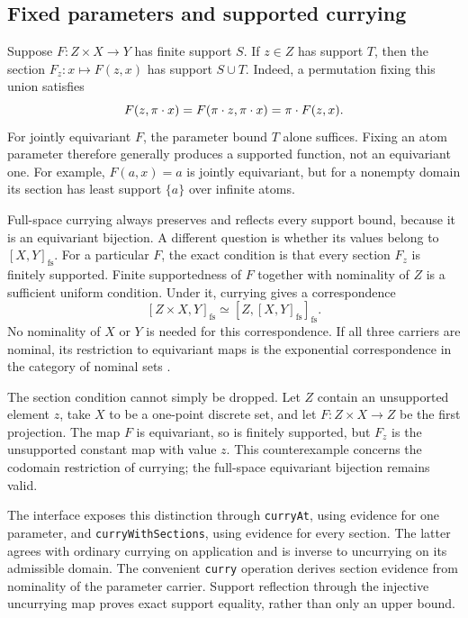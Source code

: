 \subsection{Fixed parameters and supported currying}
\label{sec:supported-currying}

Suppose $F:Z\times X\to Y$ has finite support $S$. If $z\in Z$ has
support $T$, then the section $F_z:x\mapsto F(z,x)$ has support
$S\cup T$. Indeed, a permutation fixing this union satisfies
\[
  F(z,\pi\mathbin{\cdot} x)=F(\pi\mathbin{\cdot} z,\pi\mathbin{\cdot} x)=\pi\mathbin{\cdot} F(z,x).
\]
For jointly equivariant $F$, the parameter bound $T$ alone suffices.
Fixing an atom parameter therefore generally produces a supported function,
not an equivariant one. For example, $F(a,x)=a$ is jointly equivariant,
but for a nonempty domain its section has least support $\{a\}$ over
infinite atoms.

Full-space currying always preserves and reflects every support bound,
because it is an equivariant bijection. A different question is whether
its values belong to $[X,Y]_{\mathrm{fs}}$. For a particular $F$, the
exact condition is that every section $F_z$ is finitely supported.
Finite supportedness of $F$ together with nominality of $Z$ is a
sufficient uniform condition. Under it, currying gives a correspondence
\[
  [Z\times X,Y]_{\mathrm{fs}}
    \simeq [Z,[X,Y]_{\mathrm{fs}}]_{\mathrm{fs}}.
\]
No nominality of $X$ or $Y$ is needed for this correspondence. If all three
carriers are nominal, its restriction to equivariant maps is the
exponential correspondence in the category of nominal sets
\cite[Section~2.4 and Theorem~2.19, pp.~35--36]{pitts2013}.

The section condition cannot simply be dropped. Let $Z$ contain an
unsupported element $z$, take $X$ to be a one-point discrete set, and let
$F:Z\times X\to Z$ be the first projection. The map $F$ is equivariant,
so is finitely supported, but $F_z$ is the unsupported constant map with
value $z$. This counterexample concerns the codomain restriction of
currying; the full-space equivariant bijection remains valid.

The interface exposes this distinction through \texttt{curryAt}, using evidence
for one parameter, and \texttt{curryWithSections}, using evidence for every
section. The latter agrees with ordinary currying on application and is inverse
to uncurrying on its admissible domain. The convenient \texttt{curry} operation
derives section evidence from nominality of the parameter carrier. Support
reflection through the injective uncurrying map proves exact support equality,
rather than only an upper bound.

